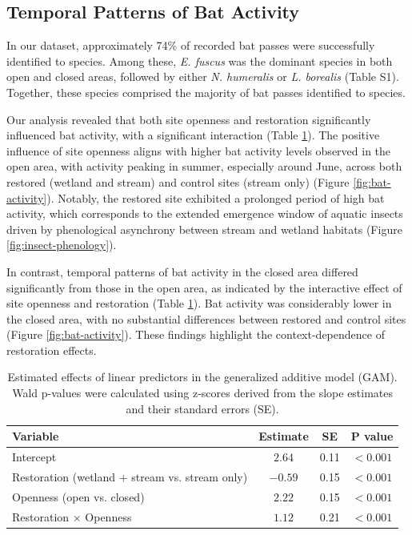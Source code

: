 \documentclass[11pt, class=article, crop=false]{standalone}
\begin{document}
\subsection{Temporal Patterns of Bat Activity}

In our dataset, approximately 74\% of recorded bat passes were successfully identified to species. Among these, \textit{E. fuscus} was the dominant species in both open and closed areas, followed by either \textit{N. humeralis} or \textit{L. borealis} (Table S1).
Together, these species comprised the majority of bat passes identified to species.

Our analysis revealed that both site openness and restoration significantly influenced bat activity, with a significant interaction (Table \ref{tab:gam-est}).
The positive influence of site openness aligns with higher bat activity levels observed in the open area, with activity peaking in summer, especially around June, across both restored (wetland and stream) and control sites (stream only) (Figure \ref{fig:bat-activity}).
Notably, the restored site exhibited a prolonged period of high bat activity, which corresponds to the extended emergence window of aquatic insects driven by phenological asynchrony between stream and wetland habitats (Figure \ref{fig:insect-phenology}).

In contrast, temporal patterns of bat activity in the closed area differed significantly from those in the open area, as indicated by the interactive effect of site openness and restoration (Table \ref{tab:gam-est}).
Bat activity was considerably lower in the closed area, with no substantial differences between restored and control sites (Figure \ref{fig:bat-activity}).
These findings highlight the context-dependence of restoration effects.

%
\begin{table}[ht]
\centering
\caption{Estimated effects of linear predictors in the generalized additive model (GAM).
             Wald p-values were calculated using z-scores derived from the slope estimates and their standard errors (SE).} 
\label{tab:gam-est}
\begingroup\small
\begin{tabular}{lccc}
  \hline
Variable & Estimate & SE & P value \\ 
  \hline
Intercept & $2.64$ & 0.11 & $<0.001$ \\ 
  Restoration (wetland + stream vs. stream only) & $-0.59$ & 0.15 & $<0.001$ \\ 
  Openness (open vs. closed) & $2.22$ & 0.15 & $<0.001$ \\ 
  Restoration $\times$ Openness & $1.12$ & 0.21 & $<0.001$ \\ 
   \hline
\end{tabular}
\endgroup
\end{table}
\end{document}
